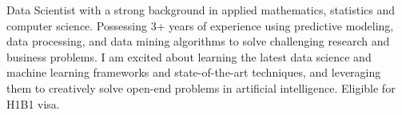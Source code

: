 

\begin{cvparagraph}


Data Scientist with a strong background in applied mathematics, statistics and computer science. Possessing 
3+ years of experience using predictive modeling, data processing, and data mining algorithms to solve
challenging research and business problems. I am excited about learning the
latest data science and machine learning frameworks and state-of-the-art techniques, and leveraging them 
to creatively solve open-end problems in artificial intelligence. Eligible for H1B1 visa.
\end{cvparagraph}
